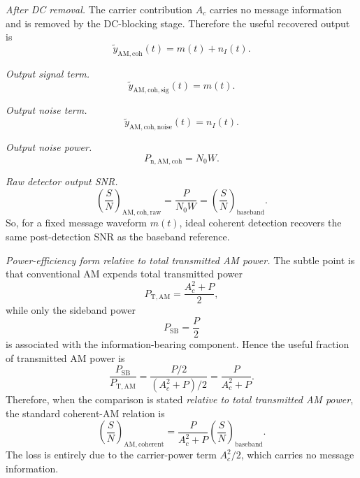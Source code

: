 \begin{tcolorbox}[breakable, colback=cyan!4!white, colframe=cyan!60!black,
title={\textbf{Intuition: Step-by-Step Output SNR Models Under AWGN}}]
\emph{After DC removal.}
The carrier contribution $A_c$ carries no message information and is removed by
the DC-blocking stage. Therefore the useful recovered output is
\begin{equation}
\tilde{y}_{\mathrm{AM,coh}}(t)=m(t)+n_I(t).
\end{equation}

\emph{Output signal term.}
\begin{equation}
\tilde{y}_{\mathrm{AM,coh,sig}}(t)=m(t).
\end{equation}

\emph{Output noise term.}
\begin{equation}
\tilde{y}_{\mathrm{AM,coh,noise}}(t)=n_I(t).
\end{equation}

\emph{Output noise power.}
\begin{equation}
P_{\mathrm{n,AM,coh}}=N_0 W.
\end{equation}

\emph{Raw detector output SNR.}
\begin{equation}
\left(\frac{S}{N}\right)_{\mathrm{AM,coh,raw}}
=
\frac{P}{N_0 W}
=
\left(\frac{S}{N}\right)_{\mathrm{baseband}}.
\end{equation}
So, for a fixed message waveform $m(t)$, ideal coherent detection recovers the
same post-detection SNR as the baseband reference.

\emph{Power-efficiency form relative to total transmitted AM power.}
The subtle point is that conventional AM expends total transmitted power
\begin{equation}
P_{\mathrm{T,AM}}=\frac{A_c^2+P}{2},
\end{equation}
while only the sideband power
\begin{equation}
P_{\mathrm{SB}}=\frac{P}{2}
\end{equation}
is associated with the information-bearing component. Hence the useful fraction
of transmitted AM power is
\begin{equation}
\frac{P_{\mathrm{SB}}}{P_{\mathrm{T,AM}}}
=
\frac{P/2}{(A_c^2+P)/2}
=
\frac{P}{A_c^2+P}.
\end{equation}
Therefore, when the comparison is stated \emph{relative to total transmitted
AM power}, the standard coherent-AM relation is
\begin{equation}
\left(\frac{S}{N}\right)_{\mathrm{AM,coherent}}
=
\frac{P}{A_c^2+P}
\left(\frac{S}{N}\right)_{\mathrm{baseband}}.
\label{eq:lab2_awgn_am_coh_efficiency}
\end{equation}
The loss is entirely due to the carrier-power term $A_c^2/2$, which carries no
message information.


\end{tcolorbox}
